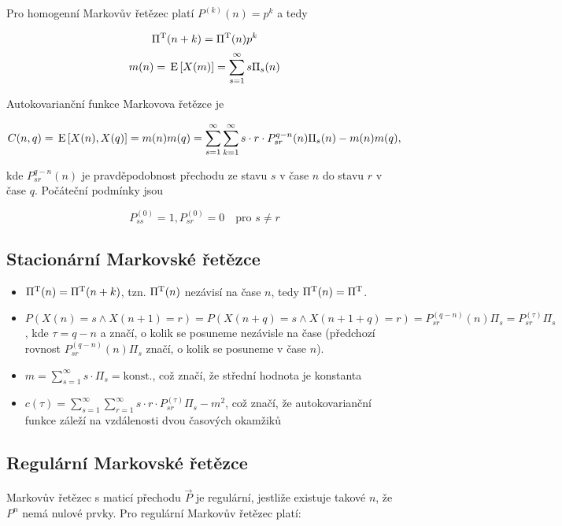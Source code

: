 Pro homogenní Markovův řetězec platí $P^{(k)}(n)=p^k$ a tedy

\[ \Pi^{\mathrm{T}}(n+k) = \Pi^{\mathrm{T}}(n)p^k \]
\[ m(n) = \,\mathrm{E}\left[X(m)\right]=\sum_{s=1}^\infty s\Pi_s(n) \]

Autokovarianční funkce Markovova řetězce je

\[ C(n,q)=\,\mathrm{E}\left[X(n),X(q)\right]=m(n)m(q)=\sum_{s=1}^\infty\sum_{k=1}^\infty s\cdot r\cdot P_{sr}^{q-n}(n)\Pi_s(n)-m(n)m(q), \]

kde $P_{sr}^{q-n}(n)$ je pravděpodobnost přechodu ze stavu $s$ v čase $n$ do stavu $r$ v čase $q$. Počáteční podmínky jsou

\[ P_{ss}^{(0)}=1, P_{sr}^{(0)}=0\quad\text{pro } s\neq r \]

\subsection{Stacionární Markovské řetězce}
\begin{itemize}
\item $\Pi^{\mathrm{T}}(n)=\Pi^{\mathrm{T}}(n+k)$, tzn. $\Pi^{\mathrm{T}}(n)$ nezávisí na čase $n$, tedy $\Pi^{\mathrm{T}}(n)=\Pi^{\mathrm{T}}$.
\item $P(X(n)=s \wedge X(n+1)=r)=P(X(n+q)=s \wedge X(n+1+q)=r)=P_{sr}^{(q-n)}(n)\Pi_s=P_{sr}^{(\tau)}\Pi_s$, kde $\tau = q-n$ a značí, o kolik se posuneme nezávisle na čase (předchozí rovnost $P_{sr}^{(q-n)}(n)\Pi_s$ značí, o kolik se posuneme v čase $n$).
\item $m=\displaystyle\sum_{s=1}^\infty s\cdot\Pi_s=\text{konst.}$, což značí, že střední hodnota je konstanta
\item $c(\tau)=\sum_{s=1}^\infty\sum_{r=1}^\infty s\cdot r\cdot P_{sr}^{(\tau)}\Pi_s-m^2$, což značí, že autokovarianční funkce záleží na vzdálenosti dvou časových okamžiků 
\end{itemize}

\subsection{Regulární Markovské řetězce}
Markovův řetězec s maticí přechodu $\vec{P}$ je regulární, jestliže existuje takové $n$, že $P^n$ nemá nulové prvky. Pro regulární Markovův řetězec platí:

